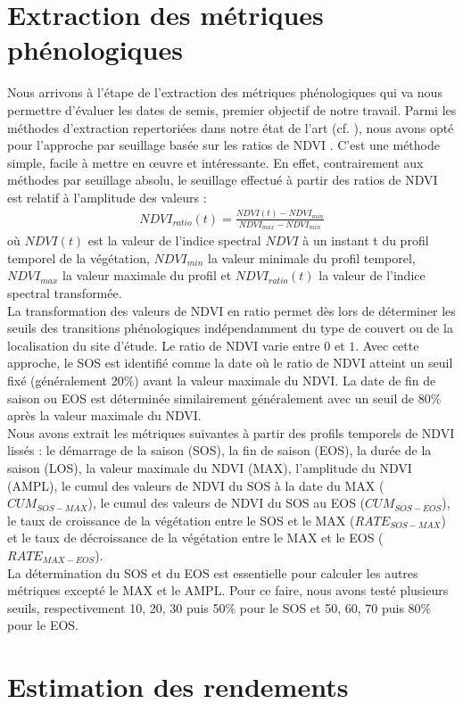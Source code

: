 \section{Extraction des métriques phénologiques}
Nous arrivons à l'étape de l'extraction des métriques phénologiques qui va nous permettre d'évaluer les dates de semis, premier objectif de notre travail. Parmi les méthodes d'extraction repertoriées dans notre état de l'art (cf. ), nous avons opté pour l'approche par seuillage basée sur les ratios de NDVI \citep{White1997}. C'est une méthode simple, facile à mettre en \oe uvre et intéressante. En effet, contrairement aux méthodes par seuillage absolu, le seuillage effectué à partir des ratios de NDVI est relatif à l'amplitude des valeurs : 
\begin{align}
 NDVI_{ratio}(t) = \frac{NDVI(t) - NDVI_{min}}{NDVI_{max}-NDVI_{min}} %
\end{align}
où $NDVI(t)$ est la valeur de l'indice spectral $NDVI$ à un instant t du profil temporel de la végétation, $NDVI_{min}$ la valeur minimale du profil temporel, $NDVI_{max}$ la valeur maximale du profil et $NDVI_{ratio}(t)$ la valeur de l'indice spectral transformée. 
\\La transformation des valeurs de NDVI en ratio permet dès lors de déterminer les seuils des transitions phénologiques indépendamment du type de couvert ou de la localisation du site d'étude. Le ratio de NDVI varie entre $0$ et $1$. Avec cette approche, le SOS est identifié comme la date où le ratio de NDVI atteint un seuil fixé (généralement 20\%) avant la valeur maximale du NDVI. La date de fin de saison ou EOS est déterminée similairement généralement avec un seuil de 80\% après la valeur maximale du NDVI.
\\Nous avons extrait les métriques suivantes à partir des profils temporels de NDVI lissés : le démarrage de la saison (SOS), la fin de saison (EOS), la durée de la saison (LOS), la valeur maximale du NDVI (MAX), l'amplitude du NDVI (AMPL), le cumul des valeurs de NDVI du SOS à la date du MAX ($CUM_{SOS-MAX}$), le cumul des valeurs de NDVI du SOS au EOS ($CUM_{SOS-EOS}$), le taux de croissance de la végétation entre le SOS et le MAX ($RATE_{SOS-MAX}$) et le taux de décroissance de la végétation entre le MAX et le EOS ($RATE_{MAX-EOS}$).
\\La détermination du SOS et du EOS est essentielle pour calculer les autres métriques excepté le MAX et le AMPL. Pour ce faire, nous avons testé plusieurs seuils, respectivement 10, 20, 30 puis 50\% pour le SOS et 50, 60, 70 puis 80\% pour le EOS.

\section{Estimation des rendements}
